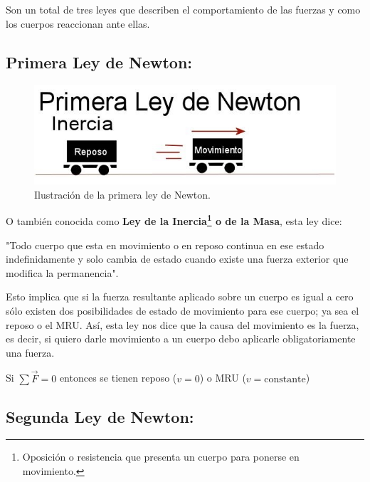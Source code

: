 \documentclass[a5paper,pagesize,10pt,bibtotoc,pointlessnumbers,
normalheadings,DIV=9,fleqn,x11names,table,twoside=false]{scrbook}
\begin{document}
Son un total de tres leyes que describen el comportamiento de las fuerzas y como los cuerpos reaccionan ante ellas.

\subsection{Primera Ley de Newton:}

\begin{figure}[ht]
 \centering
 \includegraphics[scale=0.5]{images/primera-ley-de-newton.jpg}
 \caption{Ilustración de la primera ley de Newton.}\label{ac}
\end{figure} 

O también conocida como \textbf{Ley de la Inercia\footnote{Oposición o resistencia que presenta un cuerpo para ponerse 
en movimiento.} o de la Masa}, esta ley dice:

\begin{tcolorbox}
"Todo cuerpo que esta en movimiento o en reposo continua en ese estado indefinidamente y solo cambia de estado cuando existe una 
fuerza exterior que modifica la permanencia".
\end{tcolorbox}

Esto implica que si la fuerza resultante aplicado sobre un cuerpo es igual a cero sólo existen dos posibilidades de estado de 
movimiento para ese cuerpo; ya sea el reposo o el MRU. Así, esta ley nos dice que la causa del movimiento es la fuerza, es decir, 
si quiero darle movimiento a un cuerpo debo aplicarle obligatoriamente una fuerza.

\begin{tcolorbox}
Si $\sum \vec{F} = 0$ entonces se tienen reposo ($v = 0$) o MRU ($v =  \text{constante}$)
\end{tcolorbox}

\subsection{Segunda Ley de Newton:}
\end{document}
